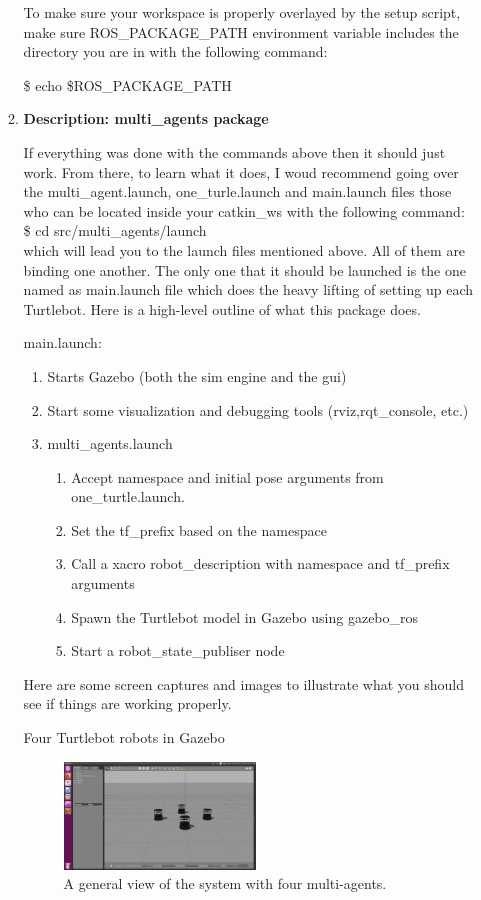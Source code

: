 \documentclass[journal]{IEEEtran}
\begin{document}
\begin{enumerate}
\begin{enumerate}
To make sure your workspace is properly overlayed by the setup script, make sure ROS{\_}PACKAGE{\_}PATH environment variable includes the directory you are in with the following command:

{\$} echo {\$}ROS{\_}PACKAGE{\_}PATH



\item \textbf {Description: multi{\_}agents package}


If everything was done with the commands above then it should just work. From there, to learn what it does, I woud recommend going over the multi{\_}agent.launch, one{\_}turle.launch and main.launch files those who can be located inside your catkin{\_}ws with the following command:\\
{\$} cd src/multi{\_}agents/launch \\
which will lead you to the launch files mentioned above. All of them are binding one another. The only one that it should be launched is the one named as main.launch file which does the heavy lifting of setting up each Turtlebot. Here is a high-level outline of what this package does.

main.launch:
\begin{enumerate}
\item {Starts Gazebo (both the sim engine and the gui)}
\item {Start some visualization and debugging tools (rviz,rqt{\_}console, etc.)}
\item {multi{\_}agents.launch}

\begin{enumerate}
\item {Accept namespace and initial pose arguments from one{\_}turtle.launch}.
\item {Set the tf{\_}prefix based on the namespace}
\item {Call a xacro robot{\_}description with namespace and tf{\_}prefix arguments}
\item {Spawn the Turtlebot model in Gazebo using gazebo{\_}ros}
\item {Start a robot{\_}state{\_}publiser node}
\end{enumerate}
\end{enumerate}
Here are some screen captures and images to illustrate what you should see if things are working properly.
    
 

Four Turtlebot robots in Gazebo
\begin{figure}[!h]
\begin{center}
\includegraphics[width=2in]{three.png}
\caption{A general view of the system with four multi-agents.}
\end{center}
\label{fig:mypicture4}
\end{figure}



\end{enumerate}
\end{enumerate}
\end{document}
